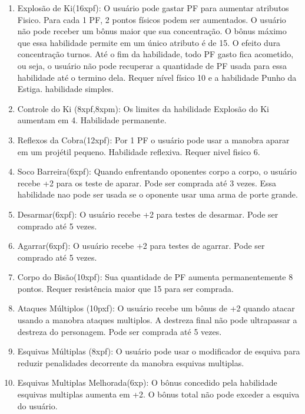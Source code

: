 \begin{enumerate}
		\item Explosão de Ki(16xpf): O usuário pode gastar PF para aumentar atributos Fisico. Para cada 1 PF, 2 pontos físicos podem ser aumentados. O usuário não pode receber um bônus maior que sua concentração. O bônus máximo que essa habilidade permite em um único atributo é de 15. O efeito dura concentração turnos. Até o fim da habilidade, todo PF gasto fica acometido, ou seja, o usuário não pode recuperar a quantidade de PF usada para essa habilidade até o termino dela. Requer nível físico 10 e a habilidade Punho da Estiga. habilidade simples.
 
		\item Controle do Ki (8xpf,8xpm): Os limites da habilidade Explosão do Ki aumentam em 4. Habilidade permanente.

		\item Reflexos da Cobra(12xpf): Por 1 PF o usuário pode usar a manobra aparar em um projétil pequeno. Habilidade reflexiva. Requer nivel fisico 6.

  	\item Soco Barreira(6xpf): Quando enfrentando oponentes corpo a corpo, o usuário recebe +2 para os teste de aparar. Pode ser comprada até 3 vezes. Essa habilidade nao pode ser usada se o oponente usar uma arma de porte grande.
  
  	\item Desarmar(6xpf): O usuário recebe +2 para testes de desarmar. Pode ser comprado até 5 vezes.
  
  	\item Agarrar(6xpf): O usuário recebe +2 para testes de agarrar. Pode ser comprado até 5 vezes.
  
	\item Corpo do Bisão(10xpf): Sua quantidade de PF aumenta permanentemente 8 pontos. Requer resistência maior que 15 para ser comprada.

	\item Ataques Múltiplos (10pxf): O usuário recebe um bônus de +2 quando atacar usando a manobra ataques multiplos. A destreza final não pode ultrapassar a destreza do personagem. Pode ser comprada até 5 vezes. 

	\item Esquivas Múltiplas (8xpf): O usuário pode usar o modificador de esquiva para reduzir penalidades decorrente da manobra esquivas multiplas. 

	\item Esquivas Multiplas Melhorada(6xp): O bônus concedido pela habilidade esquivas multiplas aumenta em +2. O bônus total não pode exceder a esquiva do usuário.
  

\end{enumerate}
